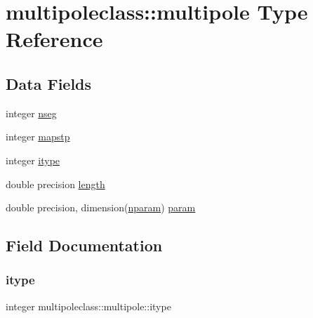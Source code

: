 \hypertarget{structmultipoleclass_1_1multipole}{}\section{multipoleclass\+::multipole Type Reference}
\label{structmultipoleclass_1_1multipole}
\subsection*{Data Fields}
\begin{DoxyCompactItemize}
\item 
integer \mbox{\hyperlink{structmultipoleclass_1_1multipole_a7e808e5433de77a1defc9a21691400dc}{nseg}}
\item 
integer \mbox{\hyperlink{structmultipoleclass_1_1multipole_a4d8dd9ec28f1f2396c1fe8634b1ffb81}{mapstp}}
\item 
integer \mbox{\hyperlink{structmultipoleclass_1_1multipole_a0819a9c738ccf5ddd0aa69c2a7befd2a}{itype}}
\item 
double precision \mbox{\hyperlink{structmultipoleclass_1_1multipole_aa096a41e77f2a963837b3ec8d5b3324b}{length}}
\item 
double precision, dimension(\mbox{\hyperlink{namespacemultipoleclass_a67bb1a71461cf39cdd365adab7fec8b9}{nparam}}) \mbox{\hyperlink{structmultipoleclass_1_1multipole_ab06c87e37bb85347c808f7e43bd9bd1f}{param}}
\end{DoxyCompactItemize}


\subsection{Field Documentation}
\mbox{\label{structmultipoleclass_1_1multipole_a0819a9c738ccf5ddd0aa69c2a7befd2a}} 
\subsubsection{\texorpdfstring{itype}{itype}}
{\footnotesize\ttfamily integer multipoleclass\+::multipole\+::itype}

\mbox{\label{structmultipoleclass_1_1multipole_aa096a41e77f2a963837b3ec8d5b3324b}} 

